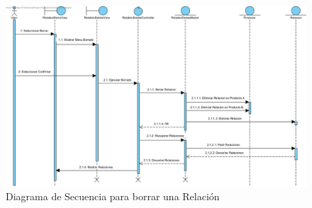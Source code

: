 \newpage %

\begin{figure}[H]
    \includegraphics[width=1\linewidth]{assets/sequence/Borrar.jpg}
    \caption{Diagrama de Secuencia para borrar una Relación}
   \end{figure}
\vspace{1.0cm}

\newpage %